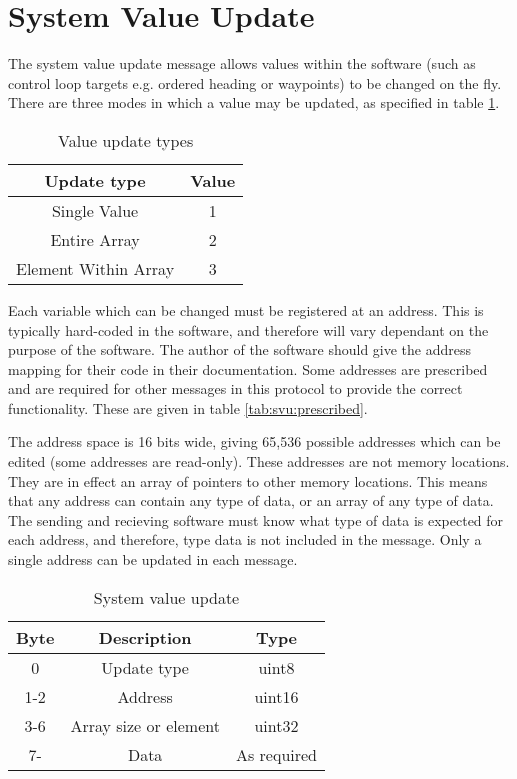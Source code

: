 \section{System Value Update}
\label{msg008}
The system value update message allows values within the software (such as control loop targets e.g. ordered heading or waypoints) to be changed on the fly. There are three modes in which a value may be updated, as specified in table \ref{tab:svu:updTypes}.

\begin{table}[H]
  \centering
  \begin{tabular}{ c c }
    Update type           & Value\\
\hline
    Single Value          & 1 \\
    Entire Array          & 2 \\
    Element Within Array  & 3 \\
  \end{tabular}
  \caption{Value update types}
  \label{tab:svu:updTypes}
\end{table}

Each variable which can be changed must be registered at an address. This is typically hard-coded in the software, and therefore will vary dependant on the purpose of the software. The author of the software should give the address mapping for their code in their documentation. Some addresses are prescribed and are required for other messages in this protocol to provide the correct functionality. These are given in table \ref{tab:svu:prescribed}.

The address space is 16 bits wide, giving 65,536 possible addresses which can be edited (some addresses are read-only). These addresses are not memory locations. They are in effect an array of pointers to other memory locations. This means that any address can contain any type of data, or an array of any type of data. The sending and recieving software must know what type of data is expected for each address, and therefore, type data is not included in the message. Only a single address can be updated in each message.

\begin{table}[H]
  \centering
  \begin{tabular}{ c c c }
  Byte & Description & Type \\
\hline
    0   & Update type & uint8 \\
   1-2  & Address     & uint16 \\
   3-6  & Array size or element & uint32 \\
   7-   & Data & As required \\
  \end{tabular}
  \caption{System value update}
\end{table}

